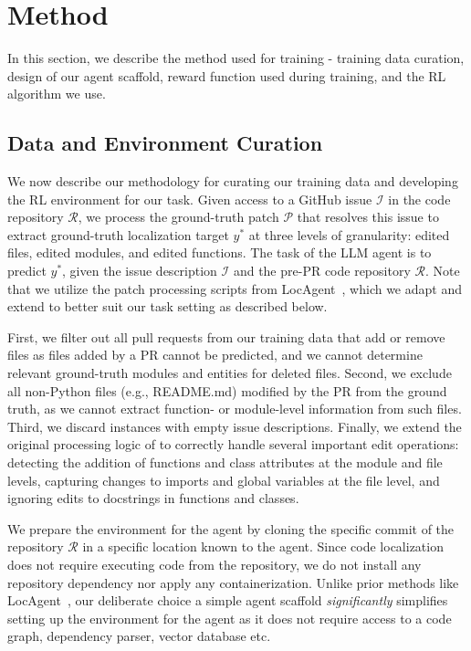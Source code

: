 \section{Method}

In this section, we describe the method used for training \methodname - training data curation, design of our agent scaffold, reward function used during training, and the RL algorithm we use.


\subsection{Data and Environment Curation}
\label{sec:data_creation}

We now describe our methodology for curating our training data and developing the RL environment for our task. Given access to a GitHub issue $\mathcal{I}$ in the code repository $\mathcal{R}$, we process the ground-truth patch $\mathcal{P}$ that resolves this issue to extract ground-truth localization target $y^{*}$ at three levels of granularity: edited files, edited modules, and edited functions. The task of the LLM agent is to predict $y^{*}$, given the issue description $\mathcal{I}$ and the pre-PR code repository $\mathcal{R}$. Note that we utilize the patch processing scripts from LocAgent~\citep{chen-etal-2025-locagent}, which we adapt and extend to better suit our task setting as described below.

First, we filter out all pull requests from our training data that add or remove files as files added by a PR cannot be predicted, and we cannot determine relevant ground-truth modules and entities for deleted files. Second, we exclude all non-Python files (e.g., README.md) modified by the PR from the ground truth, as we cannot extract function- or module-level information from such files. Third, we discard instances with empty issue descriptions. Finally, we extend the original processing logic of \citet{chen-etal-2025-locagent} to correctly handle several important edit operations: detecting the addition of functions and class attributes at the module and file levels, capturing changes to imports and global variables at the file level, and ignoring edits to docstrings in functions and classes.

We prepare the environment for the agent by cloning the specific commit of the repository $\mathcal{R}$ in a specific location known to the agent. Since code localization does not require executing code from the repository, we do not  install any repository dependency nor apply any containerization. Unlike prior methods like LocAgent~\citep{chen-etal-2025-locagent}, our deliberate choice a simple agent scaffold \emph{significantly} simplifies setting up the environment for the agent as it does not require access to a code graph, dependency parser, vector database etc. 

